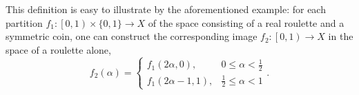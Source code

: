 This definition is easy to illustrate by the aforementioned example: for each partition $f_1 : \left[0, 1\right) \times \{0, 1\} \rightarrow X$ of the space consisting of a real roulette and a symmetric coin, one can construct the corresponding image $f_2 : \left[0, 1\right) \rightarrow X$ in the space of a roulette alone, %
\begin{equation*}
	f_2(\alpha) = \begin{cases}
		f_1(2 \alpha, 0), & 0 \le \alpha < \frac{1}{2} \\
		f_1(2 \alpha - 1, 1), & \frac{1}{2} \le \alpha < 1
	\end{cases}.
\end{equation*}

